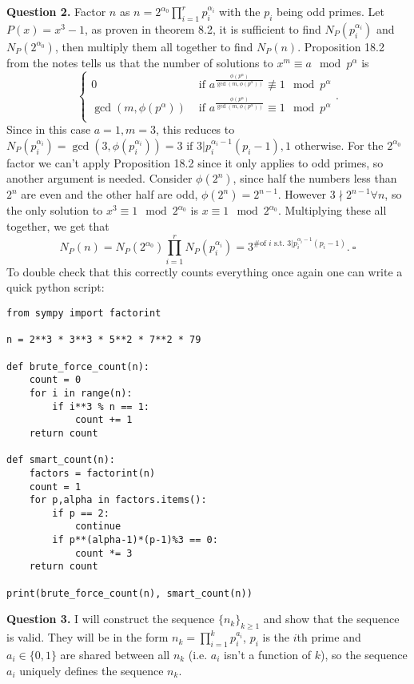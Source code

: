 \documentclass[letterpaper, reqno,11pt]{article}
\begin{document}
{\medskip\noindent\bf Question 2.} Factor $n$ as $n=2^{\alpha_0}\prod_{i=1}^{r}p_i^{\alpha_i}$ with the $p_i$ being odd primes. Let $P(x)=x^{3}-1$, as proven in theorem 8.2, it is sufficient to find $N_P(p_i^{\alpha_i})$ and $N_P(2^{\alpha_0})$, then multiply them all together to find $N_P(n)$. Proposition 18.2 from the notes tells us that the number of solutions to $x^{m}\equiv a\mod p^{\alpha}$ is
\[
\begin{cases}
    0&\text{ if }a^\frac{\phi(p^{\alpha})}{\gcd(m,\phi(p^{\alpha}))}\not\equiv 1\mod p^{\alpha}\\
    \gcd(m,\phi(p^{\alpha}))&\text{ if }a^\frac{\phi(p^{\alpha})}{\gcd(m,\phi(p^{\alpha}))}\equiv 1\mod p^{\alpha}\\
\end{cases}
.\]
Since in this case $a=1,m=3$, this reduces to $N_P(p_i^{\alpha_i})=\gcd\left( 3,\phi(p_i^{\alpha_i}) \right) =3\text{ if }3|p_i^{\alpha_i-1}\left( p_i-1 \right), 1\text{ otherwise}$. For the $2^{\alpha_0}$ factor we can't apply Proposition 18.2 since it only applies to odd primes, so another argument is needed. Consider $\phi(2^{n})$, since half the numbers less than $2^{n}$ are even and the other half are odd, $\phi(2^{n})=2^{n-1}$. However $3\nmid 2^{n-1}\forall n$, so the only solution to $x^{3}\equiv 1\mod 2^{\alpha_0}$ is $x\equiv 1\mod 2^{\alpha_0}$. Multiplying these all together, we get that
\[
N_{P}(n)=N_P(2^{\alpha_0})\prod_{i=1}^{r}N_P(p_i^{\alpha_i})=3^{\text{\# of }i\text{ s.t. }3|p_i^{\alpha_i-1}(p_i-1)}
.\ \square\]
To double check that this correctly counts everything once again one can write a quick python script:
\begin{lstlisting}
from sympy import factorint

n = 2**3 * 3**3 * 5**2 * 7**2 * 79

def brute_force_count(n):
    count = 0
    for i in range(n):
        if i**3 % n == 1:
            count += 1
    return count

def smart_count(n):
    factors = factorint(n)
    count = 1
    for p,alpha in factors.items():
        if p == 2:
            continue
        if p**(alpha-1)*(p-1)%3 == 0:
            count *= 3
    return count

print(brute_force_count(n), smart_count(n))
\end{lstlisting}

{\medskip\noindent\bf Question 3.} I will construct the sequence $\{n_k\}_{k\geq 1}$ and show that the sequence is valid. They will be in the form $n_k=\prod_{i=1}^{k}p_i^{a_i}$, $p_i$ is the $i$th prime and $a_i\in \{0,1\}$ are shared between all $n_k$ (i.e. $a_i$ isn't a function of $k$), so the sequence $a_i$ uniquely defines the sequence $n_k$. 
\end{document}
